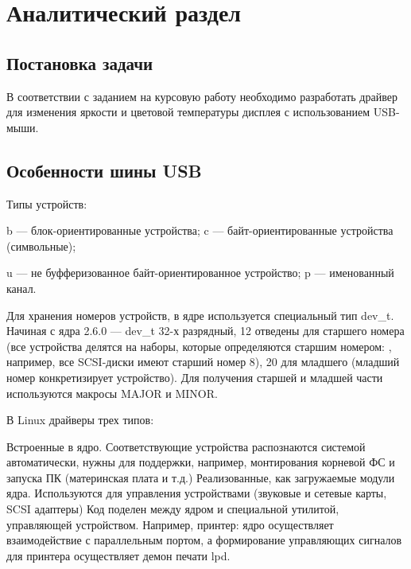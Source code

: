\section{Аналитический раздел}

\subsection{Постановка задачи}

В соответствии с заданием на курсовую работу необходимо разработать драйвер для изменения яркости и цветовой температуры дисплея с использованием USB-мыши.

\subsection{Особенности шины USB}

Типы устройств:

b — блок-ориентированные устройства;
c — байт-ориентированные устройства (символьные);

u — не буфферизованное байт-ориентированное устройство; p — именованный канал.

Для хранения номеров устройств, в ядре используется специальный тип dev\_t. Начиная с ядра 2.6.0 — dev\_t 32-х разрядный, 12 отведены для старшего номера (все устройства делятся на наборы, которые определяются старшим номером: , например, все SCSI-диски имеют старший номер 8), 20 для младшего (младший номер конкретизирует устройство). Для получения старшей и младшей части используются макросы MAJOR и MINOR.


В Linux драйверы трех типов:

Встроенные в ядро. Соответствующие устройства распознаются системой автоматически, нужны для поддержки, например, монтирования корневой ФС и запуска ПК (материнская плата и т.д.)
Реализованные, как загружаемые модули ядра. Используются для управления устройствами (звуковые и сетевые карты, SCSI адаптеры)
Код поделен между ядром и специальной утилитой, управляющей устройством. Например, принтер: ядро осуществляет взаимодействие с параллельным портом, а формирование управляющих сигналов для принтера осуществляет демон печати lpd.

